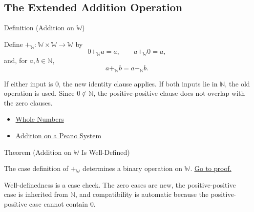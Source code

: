 \subsection*{The Extended Addition Operation}

\begin{definitionbox}{Definition (Addition on \texorpdfstring{$\mathbb{W}$}{W})}
\begin{definition}
\label{def:addition-on-w}
Define $+_{\mathbb{W}}:\mathbb{W}\times\mathbb{W}\to\mathbb{W}$ by
\[
0+_{\mathbb{W}}a=a,\qquad
a+_{\mathbb{W}}0=a,
\]
and, for $a,b\in\mathbb{N}$,
\[
a+_{\mathbb{W}}b=a+_{\mathbb{N}}b.
\]
\end{definition}
\end{definitionbox}

\begin{remark*}[Interpretation]
If either input is $0$, the new identity clause applies. If both inputs lie in
$\mathbb{N}$, the old operation is used. Since $0\notin\mathbb{N}$, the
positive-positive clause does not overlap with the zero clauses.
\end{remark*}

\begin{dependencies}
\begin{itemize}
  \item \hyperref[def:whole-numbers]{Whole Numbers}
  \item \hyperref[def:addition-on-peano-system]{Addition on a Peano System}
\end{itemize}
\end{dependencies}

\begin{theorembox}{Theorem (Addition on \texorpdfstring{$\mathbb{W}$}{W} Is Well-Defined)}
\begin{theorem}
\label{thm:addition-on-w-well-defined}
The case definition of $+_{\mathbb{W}}$ determines a binary operation on
$\mathbb{W}$.
\hyperref[prf:addition-on-w-well-defined]{Go to proof.}
\end{theorem}
\end{theorembox}

\begin{remark*}[Interpretation]
Well-definedness is a case check. The zero cases are new, the
positive-positive case is inherited from $\mathbb{N}$, and compatibility is
automatic because the positive-positive case cannot contain $0$.
\end{remark*}


